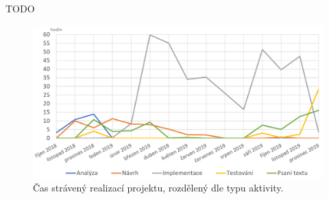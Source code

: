 \begin{conclusion} \label{conclusion}

TODO

\begin{figure}[]
\includegraphics[width=\textwidth]{../png/time/time_spent.png}
\caption[Měsíční čas strávený realizací projektu]{Čas strávený realizací projektu, rozdělený dle typu aktivity.} \label{picture:time:spent}
\end{figure}

\end{conclusion}
